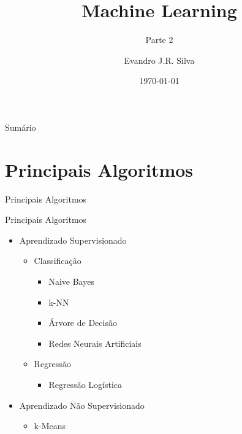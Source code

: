 \documentclass{libs/ufc_format}
\title[ML]{\huge\textbf{Machine Learning}}
\subtitle{Parte 2}
\author{Evandro J.R. Silva}
\institute[Estácio Teresina]{
    \normalsize{\email{ejrs.profissional@gmail.com}}
    \newline
    \department{Bacharelado em Ciência da Computação}
    \newline
    \estaciothe
}
\date{\today}
\begin{document}


\begin{frame}{}
    \maketitle
\end{frame}

\begin{frame}{Sumário}
    \begin{multicols}{2}
        \tableofcontents
    \end{multicols}
\end{frame}

\section{Principais Algoritmos}

\begin{frame}{}
    \centering
    \LARGE
    Principais Algoritmos
\end{frame}

\begin{frame}{Principais Algoritmos}
    \begin{itemize}
        \item<1-10> Aprendizado Supervisionado
            \begin{itemize}
                \item<2,3-6> Classificação
                    \begin{itemize}
                        \item<3-6> Naive Bayes
                        \item<4-6> k-NN
                        \item<5-6> Árvore de Decisão
                        \item<6> Redes Neurais Artificiais
                    \end{itemize}
                \item<2, 7-8> Regressão
                    \begin{itemize}
                        \item<8> Regressão Logística
                    \end{itemize}
            \end{itemize}
        \item<1, 9-10> Aprendizado Não Supervisionado
            \begin{itemize}
                \item<10> k-Means
            \end{itemize}
    \end{itemize}
\end{frame}
\end{document}

